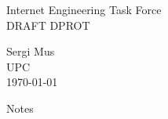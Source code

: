 \documentclass[10pt]{article}
\newcommand{\rfcId}{DPROT}
\newcommand{\rfcTitle}{Notes}
\newcommand{\rfcAuthor}{Sergi Mus}
\newcommand{\rfcDate}{\today}
\newcommand{\rfcInstitution}{UPC}
\begin{document}
\begin{multicols}{2}
	\begin{flushleft}
		Internet Engineering Task Force \\
		DRAFT \rfcId
	\end{flushleft}
\columnbreak
	\begin{flushright}
		\rfcAuthor \\
		\rfcInstitution \\
		\rfcDate
	\end{flushright}
\end{multicols}

\vspace{1in} { \center \rfcTitle \\ } \vspace{1in}

\begin{abstract}
  This document contains the notes for the subject of Data Protection.
  In it we study in depth cryptography both symetric and assymetric cryptography. 
\end{abstract}
\pagebreak

\tableofcontents
\pagebreak
\end{document}
